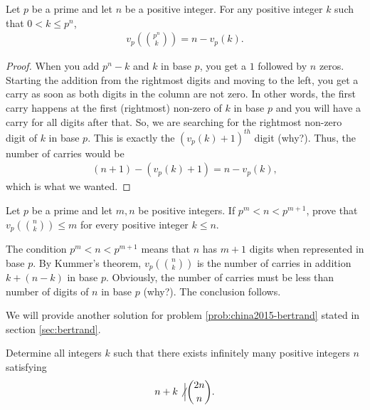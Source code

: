 \documentclass[12pt]{subfile}
\begin{document}
\begin{corollary}\label{cor:kummer-corollary}
	Let $p$ be a prime and let $n$ be a positive integer. For any positive integer $k$ such that $0<k\leq p^n$,
	\begin{align*}
	v_p\left( \binom{p^n}{k}\right)	= n - v_p(k).
	\end{align*}
\end{corollary}

\begin{proof}
	When you add $p^n - k$ and $k$ in base $p$, you get a $1$ followed by $n$ zeros. Starting the addition from the rightmost digits and moving to the left, you get a carry as soon as both digits in the column are not zero. In other words, the first carry happens at the first (rightmost) non-zero of $k$ in base $p$ and you will have a carry for all digits after that. So, we are searching for the rightmost non-zero digit of $k$ in base $p$. This is exactly the $(v_p(k)+1)^{th}$ digit (why?). Thus, the number of carries would be
	\begin{align*}
	(n+1)-(v_p(k)+1) = n-v_p(k),
	\end{align*}
	which is what we wanted.
\end{proof}
\begin{problem}
	Let $p$ be a prime and let $m,n$ be positive integers. If $p^m < n < p^{m+1}$, prove that $v_p\left(\binom{n}{k}\right) \leq m$ for every positive integer $k\leq n$.
\end{problem}

\begin{solution}
	The condition $p^m < n < p^{m+1}$ means that $n$ has $m+1$ digits when represented in base $p$. By Kummer's theorem, $v_p\left(\binom{n}{k}\right)$ is the number of carries in addition $k+(n-k)$ in base $p$. Obviously, the number of carries must be less than number of digits of $n$ in base $p$ (why?). The conclusion follows.
\end{solution}
We will provide another solution for problem \ref{prob:china2015-bertrand} stated in section \ref{sec:bertrand}.

\begin{problem}[China 2015]
	Determine all integers $k$ such that there exists infinitely many positive integers $n$ satisfying
	\begin{align*}
	n+k \not \Big| \binom{2n}{n}.
	\end{align*}
\end{problem}
\end{document}
